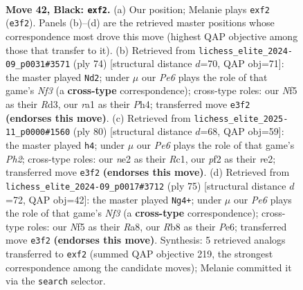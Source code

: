 \documentclass[11pt]{article}
\begin{document}
\clearpage

\begin{figure}[p]\centering
\begin{subfigure}{0.46\textwidth}\centering
\resizebox{\linewidth}{!}{%
\newchessgame
\chessboard[
  setfen={1r6/8/p1Rp1kp1/4rn1p/1p5P/4p3/4NPP1/R4K2 b - - 0 42},
  showmover=false,
  pgfstyle=straightmove, color=movearrow, markmove={e3-f2}
]}
\caption{}
\end{subfigure}\hfill
\begin{subfigure}{0.46\textwidth}\centering
\resizebox{\linewidth}{!}{%
\newchessgame
\chessboard[
  setfen={8/1p2k1pp/4np2/3p4/1P5P/1rPR1NP1/5P2/5K2 w - - 1 38},
  showmover=false,
  pgfstyle=straightmove, color=movearrow, markmove={f3-d2}
]}
\caption{}
\end{subfigure}
\\[4pt]
\begin{subfigure}{0.46\textwidth}\centering
\resizebox{\linewidth}{!}{%
\newchessgame
\chessboard[
  setfen={4k3/p1r3pp/2PR1p2/K3n3/1N6/1P4P1/P3r2P/2R5 w - - 11 41},
  showmover=false,
  pgfstyle=straightmove, color=movearrow, markmove={h2-h4}
]}
\caption{}
\end{subfigure}\hfill
\begin{subfigure}{0.46\textwidth}\centering
\resizebox{\linewidth}{!}{%
\newchessgame
\chessboard[
  setfen={r7/4k3/p2rpnR1/Rp3p1p/1N3P2/2P1K2b/1PB5/8 b - - 0 38},
  showmover=false,
  pgfstyle=straightmove, color=movearrow, markmove={f6-g4}
]}
\caption{}
\end{subfigure}
\caption{\textbf{Move 42, Black: \texttt{exf2}.} (a) Our position; Melanie plays \texttt{exf2} (\texttt{e3f2}). Panels (b)--(d) are the retrieved master positions whose correspondence most drove this move (highest QAP objective among those that transfer to it). (b) Retrieved from \texttt{lichess\_elite\_2024-09\_p0031\#3571} (ply 74) [structural distance $d$=70, QAP obj=71]: the master played \texttt{Nd2}; under $\mu$ our \emph{Pe6} plays the role of that game's \emph{Nf3} (a \textbf{cross-type} correspondence); cross-type roles: our \emph{N}f5 as their \emph{R}d3, our \emph{r}a1 as their \emph{P}h4; transferred move \texttt{e3f2} \textbf{(endorses this move)}. (c) Retrieved from \texttt{lichess\_elite\_2025-11\_p0000\#1560} (ply 80) [structural distance $d$=68, QAP obj=59]: the master played \texttt{h4}; under $\mu$ our \emph{Pe6} plays the role of that game's \emph{Ph2}; cross-type roles: our \emph{n}e2 as their \emph{R}c1, our \emph{p}f2 as their \emph{r}e2; transferred move \texttt{e3f2} \textbf{(endorses this move)}. (d) Retrieved from \texttt{lichess\_elite\_2024-09\_p0017\#3712} (ply 75) [structural distance $d$=72, QAP obj=42]: the master played \texttt{Ng4+}; under $\mu$ our \emph{Pe6} plays the role of that game's \emph{Nf3} (a \textbf{cross-type} correspondence); cross-type roles: our \emph{N}f5 as their \emph{R}a8, our \emph{R}b8 as their \emph{P}e6; transferred move \texttt{e3f2} \textbf{(endorses this move)}. Synthesis: 5 retrieved analogs transferred to \texttt{exf2} (summed QAP objective 219, the strongest correspondence among the candidate moves); Melanie committed it via the \texttt{search} selector.}
\label{fig:thought-m83}
\end{figure}
\end{document}

